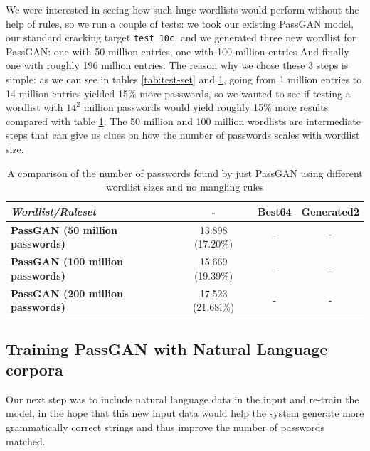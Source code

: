 We were interested in seeing how such huge wordlists would perform without the help of rules, so we run a couple of tests: we took our existing PassGAN model, our standard cracking target \texttt{test\_10c}, and we generated three new wordlist for PassGAN: one with 50 million entries, one with 100 million entries And finally one with roughly 196 million entries. 
The reason why we chose these 3 steps is simple: as we can see in tables \ref{tab:test-set} and \ref{tab:passgan-big}, going from 1 million entries to 14 million entries yielded 15\% more passwords, so we wanted to see if testing a wordlist with $14^2$ million passwords would yield roughly 15\% more results compared with table \ref{tab:passgan-big}. The 50 million and 100 million wordlists are intermediate steps that can give us clues on how the number of passwords scales with wordlist size.
\begin{table}[H]
\centering    
\begin{tabular}{|l|c|c|c|}
\hline
\textbf{\emph{Wordlist/Ruleset}} & \textbf{-} & \textbf{Best64} & \textbf{Generated2} \\ \hline
\textbf{PassGAN (50 million passwords)}          & 13.898 (17.20\%) & - & - \\ \hline
\textbf{PassGAN (100 million passwords)}          & 15.669 (19.39\%) & - & - \\ \hline
\textbf{PassGAN (200 million passwords)}          & 17.523 (21.68i\%) & - & - \\ \hline
\end{tabular}
\caption{A comparison of the number of passwords found by just PassGAN using different wordlist sizes and no mangling rules} 
\label{tab:passgan-big}
\end{table}

\subsection{Training PassGAN with Natural Language corpora} \label{subsec:nl-testing}
Our next step was to include natural language data in the input and re-train the model, in the hope that this new input data would help the system generate more grammatically correct strings and thus improve the number of passwords matched.

